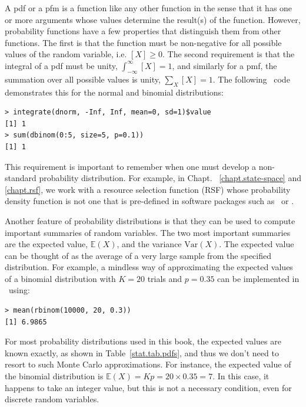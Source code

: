 A pdf or a pfm is a function like any other function
in the sense that it has one or more arguments whose values determine
the result(s) of the function. However, probability functions have a few
properties that distinguish them from other functions.
The first is that the function
must be non-negative for all possible values of the random variable,
i.e. $[X] \geq 0$. The second requirement is that the integral of
a pdf must be unity, $\int_{-\infty}^{\infty} [X] = 1$, and similarly
for a pmf, the summation over all possible values is unity, $\sum_X [X]
= 1$. The following \R~code demonstrates
this for the normal and binomial distributions:
\begin{verbatim}
> integrate(dnorm, -Inf, Inf, mean=0, sd=1)$value
[1] 1
> sum(dbinom(0:5, size=5, p=0.1))
[1] 1
\end{verbatim}
This requirement is important to remember when one must develop a
non-standard probability distribution. For example, in Chapt.
~\ref{chapt.state-space} and \ref{chapt.rsf},
we work with a resource selection function (RSF) whose probability
density function is not one that is pre-defined in software packages
such as \R~or \bugs.

Another feature of probability distributions is that they can be used
to compute important summaries of random variables. The two most
important summaries are the expected value, $\mathbb{E}(X)$,
and the variance $\text{Var}(X)$. The expected value
can be thought of as the average
of a very large sample from the specified distribution. For
example, a mindless way of approximating the expected values of a binomial
distribution with $K=20$ trials and $p=0.35$ can be implemented in \R~using:
\begin{verbatim}
> mean(rbinom(10000, 20, 0.3))
[1] 6.9865
\end{verbatim}
For most probability distributions used in this book, the expected
values are known exactly, as shown in Table~\ref{stat.tab.pdfs}, and
thus we don't need to resort to such Monte Carlo approximations. For instance, the
expected value of the binomial distribution is $\mathbb{E}(X) = Kp =
20 \times 0.35 = 7$. In this case, it happens to take an integer
value, but this is not a necessary condition, even for discrete random
variables.

